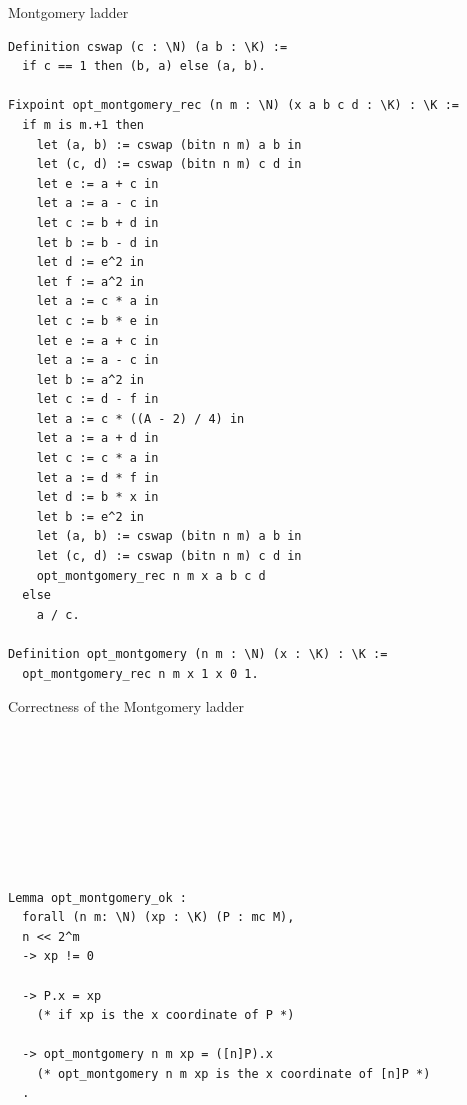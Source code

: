 \documentclass[8pt]{beamer}
\begin{document}
\begin{frame}[fragile]{Montgomery ladder}
\begin{center}
\begin{lstlisting}[language=Coq]
Definition cswap (c : \N) (a b : \K) :=
  if c == 1 then (b, a) else (a, b).

Fixpoint opt_montgomery_rec (n m : \N) (x a b c d : \K) : \K :=
  if m is m.+1 then
    let (a, b) := cswap (bitn n m) a b in
    let (c, d) := cswap (bitn n m) c d in
    let e := a + c in
    let a := a - c in
    let c := b + d in
    let b := b - d in
    let d := e^2 in
    let f := a^2 in
    let a := c * a in
    let c := b * e in
    let e := a + c in
    let a := a - c in
    let b := a^2 in
    let c := d - f in
    let a := c * ((A - 2) / 4) in
    let a := a + d in
    let c := c * a in
    let a := d * f in
    let d := b * x in
    let b := e^2 in
    let (a, b) := cswap (bitn n m) a b in
    let (c, d) := cswap (bitn n m) c d in
    opt_montgomery_rec n m x a b c d
  else
    a / c.

Definition opt_montgomery (n m : \N) (x : \K) : \K :=
  opt_montgomery_rec n m x 1 x 0 1.
\end{lstlisting}
\end{center}
\end{frame}

%
%

\begin{frame}[fragile]{Correctness of the Montgomery ladder}
\begin{center}
\begin{lstlisting}[language=Coq, basicstyle=\large]








Lemma opt_montgomery_ok :
  forall (n m: \N) (xp : \K) (P : mc M),
  n << 2^m
  -> xp != 0

  -> P.x = xp
    (* if xp is the x coordinate of P *)

  -> opt_montgomery n m xp = ([n]P).x
    (* opt_montgomery n m xp is the x coordinate of [n]P *)
  .
\end{lstlisting}
\end{center}
\end{frame}

%
%
\end{document}
